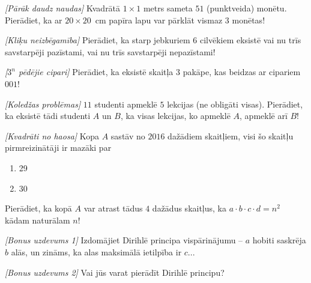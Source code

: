 \begin{problem}
\textit{[Pārāk daudz naudas]}
Kvadrātā $1\times 1$ metrs sameta $51$ (punktveida) monētu. Pierādiet, ka ar \mbox{$20\times 20$ cm} papīra lapu var pārklāt vismaz $3$ monētas!

\end{problem}

\begin{problem}
\textit{[Kliķu neizbēgamība]}
Pierādiet, ka starp jebkuriem  $6$ cilvēkiem eksistē vai nu trīs savstarpēji pazīstami, vai nu trīs savstarpēji nepazīstami!
\end{problem}

\begin{problem}
\textit{[$3^n$ pēdējie cipari]}
Pierādiet, ka eksistē skaitļa 3 pakāpe, kas beidzas ar cipariem $001$!
\end{problem}

\begin{problem}
\textit{[Koledžas problēmas]}
$11$ studenti apmeklē $5$ lekcijas (ne obligāti visas). Pierādiet, ka eksistē tādi studenti $A$ un $B$, ka visas lekcijas, ko apmeklē $A$, apmeklē arī $B$!
\end{problem}

\begin{problem}
\textit{[Kvadrāti no haosa]}
Kopa $A$ sastāv no $2016$ dažādiem skaitļiem, visi šo skaitļu pirmreizinātāji ir mazāki par 
\renewcommand{\labelenumi}{\alph{enumi})}
\begin{enumerate}
\item
29
\item
30
\end{enumerate}
Pierādiet, ka kopā $A$ var atrast tādus $4$ dažādus skaitļus, ka $a\cdot b \cdot c \cdot d = n^2$ kādam naturālam $n$!
\end{problem}

\begin{problem}
\textit{[Bonus uzdevums 1]}
Izdomājiet Dirihlē principa vispārinājumu – $a$ hobiti saskrēja $b$ alās, un zināms, ka alas maksimālā ietilpība ir $c$...
\end{problem}

\begin{problem}
\textit{[Bonus uzdevums 2]}
Vai jūs varat pierādīt Dirihlē principu?
\end{problem}


